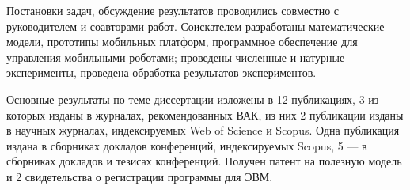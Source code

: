 %	
%	
%	
%	

{\contribution} Постановки задач, обсуждение результатов проводились совместно с руководителем и соавторами работ. Соискателем разработаны математические модели, прототипы мобильных платформ, программное обеспечение для управления мобильными роботами; проведены численные и натурные эксперименты, проведена обработка результатов экспериментов.

{\publications} Основные результаты по теме диссертации изложены в 12 публикациях, 3 из которых изданы в журналах, рекомендованных ВАК, из них 2 публикации изданы в научных журналах, индексируемых Web of Science и Scopus. Одна публикация издана в сборниках докладов конференций, индексируемых Scopus, 5 — в сборниках докладов и тезисах конференций. Получен патент на полезную модель и 2 свидетельства о регистрации программы для ЭВМ.

